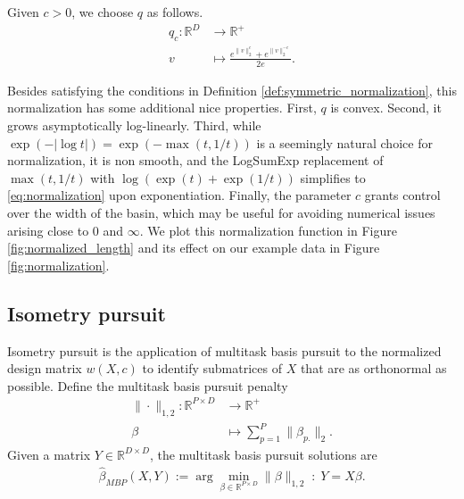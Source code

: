 Given $c > 0$, we choose $q$ as follows.
\begin{align}
q_c: \mathbb R^D  &\to \mathbb R^+ \\
v  &\mapsto \frac{e^{\|v\|_2^c} + e^{\|v\|_2^{-c}}}{2e}.
\label{eq:normalization}
\end{align}

Besides satisfying the conditions in Definition \ref{def:symmetric_normalization}, this normalization has some additional nice properties.
First, $q$ is convex.
Second, it grows asymptotically log-linearly.
Third, while $\exp(-|\log t|) = \exp(-\max (t, 1/t))$ is a seemingly natural choice for normalization, it is non smooth, and the LogSumExp \citep{Boyd2004-ql} replacement of $\max (t, 1/t)$ with $ \log (\exp (t ) + \exp(1/t))$ simplifies to \ref{eq:normalization} upon exponentiation.
Finally, the parameter $c$ grants control over the width of the basin, which may be useful for avoiding numerical issues arising close to $0$ and $\infty$.
We plot this normalization function in Figure \ref{fig:normalized_length} and its effect on our example data in Figure \ref{fig:normalization}.



\subsection{Isometry pursuit}

Isometry pursuit is the application of multitask basis pursuit to the normalized design matrix $w(X, c)$ to identify submatrices of $ X$ that are as orthonormal as possible.
Define the multitask basis pursuit penalty 
\begin{align}
\label{eq:bp}
\| \cdot \|_{1,2}: \mathbb R^{P \times D} &\to \mathbb R^+ \\ 
\beta &\mapsto  \sum_{p=1}^P  \|\beta_{p.}\|_2.
\end{align}
Given a matrix $Y \in \mathbb R^{D \times D}$, the multitask basis pursuit solutions are
\begin{align}
\label{prog:multitask_basis_pursuit}
\widehat {\mathcal {\beta}}_{MBP} (X, Y)  := \arg \min_{\beta \in \mathbb R^{P \times D}} \| \beta \|_{1,2} \; : \;Y =  X \beta.
\end{align}

